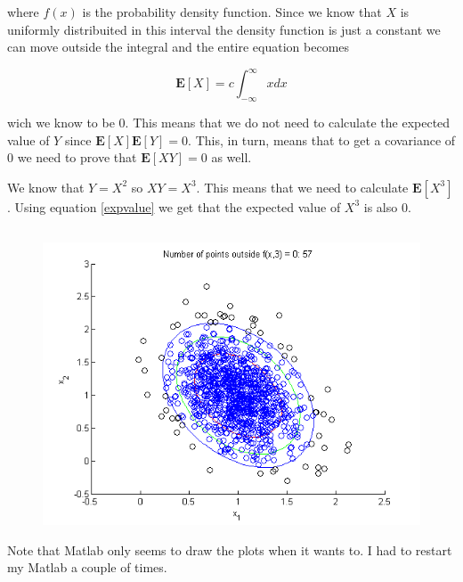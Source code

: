 \documentclass{article}
\begin{document}
where $f(x)$ is the probability density function. Since we know that $X$ is
uniformly distribuited in this interval the density function is just a constant
we can move outside the integral and the entire equation becomes

\begin{equation}
  \mathbf{E}[X] = c \int_{-\infty}^{\infty} x dx
\end{equation}

wich we know to be $0$. This means that we do not need to calculate the
expected value of $Y$ since $\mathbf{E}[X]\mathbf{E}[Y] = 0$. This, in turn,
means that to get a covariance of $0$ we need to prove that $\mathbf{E}[XY] =
0$ as well.

We know that $Y = X^2$ so $XY = X^3$. This means that we need to calculate
$\mathbf{E}[X^3]$. Using equation \ref{expvalue} we get that the expected value
of $X^3$ is also $0$.

\setcounter{section}{2}
\subsection{}

\begin{figure}[H]
\centering
\includegraphics[scale=0.7]{fig21.png}
\end{figure}

Note that Matlab only seems to draw the plots when it wants to. I had to
restart my Matlab a couple of times.

\subsection{}
\end{document}
